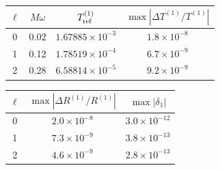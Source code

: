 \documentclass[UTF8,fontset=fandol,11pt,a4paper,oneside]{ctexart}
\numberwithin{equation}{section}
\begin{document}
\noindent\begin{minipage}{\linewidth}
\captionsetup{type=table}\caption{轴对称低频的配对分辨率检验。}\label{audit:tab:low-convergence}
\centering\fontsize{10}{13.5}\selectfont
\setlength{\tabcolsep}{6pt}\renewcommand{\arraystretch}{1.2}
\par{}\par\smallskip
\begin{tabular}{cccc}\toprule
$\ell$ & $M\omega$ & $T^{(1)}_{\rm ref}$ & $\max|\Delta T^{(1)}/T^{(1)}|$\\\midrule
0 & 0.02 & $1.67885\times10^{-3}$ & $1.8\times10^{-8}$\\
1 & 0.12 & $1.78519\times10^{-4}$ & $6.7\times10^{-9}$\\
2 & 0.28 & $6.58814\times10^{-5}$ & $9.2\times10^{-9}$\\
\bottomrule\end{tabular}
\par\medskip
\par{}\par\smallskip
\begin{tabular}{ccc}\toprule
$\ell$ & $\max|\Delta R^{(1)}/R^{(1)}|$ & $\max|\delta_1|$\\\midrule
0 & $2.0\times10^{-8}$ & $3.0\times10^{-12}$\\
1 & $7.3\times10^{-9}$ & $3.8\times10^{-13}$\\
2 & $4.6\times10^{-9}$ & $2.8\times10^{-13}$\\
\bottomrule\end{tabular}
\end{minipage}\par\addvspace{10pt}
\par\addvspace{14pt}
\end{document}

